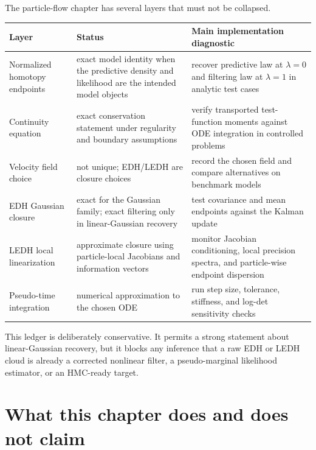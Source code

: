The particle-flow chapter has several layers that must not be collapsed.

\begin{center}
\small
\begin{tabular}{p{} p{} p{}}
\toprule
Layer & Status & Main implementation diagnostic \\
\midrule
Normalized homotopy endpoints & exact model identity when the predictive
density and likelihood are the intended model objects & recover predictive law
at $\lambda=0$ and filtering law at $\lambda=1$ in analytic test cases \\
Continuity equation & exact conservation statement under regularity and
boundary assumptions & verify transported test-function moments against ODE
integration in controlled problems \\
Velocity field choice & not unique; EDH/LEDH are closure choices & record the
chosen field and compare alternatives on benchmark models \\
EDH Gaussian closure & exact for the Gaussian family; exact filtering only in
linear-Gaussian recovery & test covariance and mean endpoints against the
Kalman update \\
LEDH local linearization & approximate closure using particle-local Jacobians
and information vectors & monitor Jacobian conditioning, local precision
spectra, and particle-wise endpoint dispersion \\
Pseudo-time integration & numerical approximation to the chosen ODE & run step
size, tolerance, stiffness, and log-det sensitivity checks \\
\bottomrule
\end{tabular}
\end{center}

This ledger is deliberately conservative.  It permits a strong statement about
linear-Gaussian recovery, but it blocks any inference that a raw EDH or LEDH
cloud is already a corrected nonlinear filter, a pseudo-marginal likelihood
estimator, or an HMC-ready target.

\section{What this chapter does and does not claim}
\label{sec:bf-pff-chapter-boundary}

